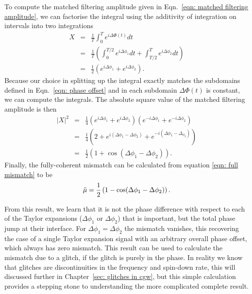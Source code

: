 \documentclass[../full_thesis/full_thesis.tex]{subfiles}
\begin{document}
To compute the matched filtering amplitude given in Eqn.~\eqref{eqn: matched
filtering amplitude}, we can factorise the integral using the additivity of
integration on intervals into two integrations
\begin{eqnarray}
X & = &\frac{1}{T } \int_{0}^{T}e^{i\Delta\Phi(t)} dt\\
 & = &\frac{1}{T }\left(\int_{0}^{T /2}e^{i\Delta\phi_{1}} dt  +
\int_{T/2}^{T} e^{i\Delta\phi_{2}}dt\right)\\
& = & \frac{1}{2}\left(e^{i\Delta\phi_{1}} + e^{i\Delta\phi_{2}}\right).
\end{eqnarray}
Because our choice in splitting up the integral exactly matches the subdomains
defined in Eqn.~\eqref{eqn: phase offset} and in each subdomain $\Delta\Phi(t)$
is constant, we can compute the integrals.
The absolute square value of the matched filtering amplitude is then
\begin{eqnarray}
|X|^{2}& = &\frac{1}{4}\left(e^{i\Delta\phi_{1}} + e^{i\Delta\phi_{2}}\right) \left(e^{-i\Delta\phi_{1}} + e^{-i\Delta\phi_{2}}\right)\\
& = &\frac{1}{4} \left(2 + e^{i(\Delta\phi_{1} - \Delta \phi_{2})} +  e^{-i(\Delta\phi_{1} - \Delta_{\phi_{2}})} \right) \\
& = &\frac{1}{2}\left(1 + \cos(\Delta\phi_{1} - \Delta\phi_{2})\right).
\end{eqnarray}
Finally, the fully-coherent mismatch can be calculated from equation \eqref{eqn: full mismatch}
to be
\begin{equation}
\tilde{\mu} = \frac{1}{2}\left(1 - \cos(\Delta\phi_{1} - \Delta\phi_{2})\right).
\label{eqn: two segment phase mismatch}
\end{equation}

From this result, we learn that it is not the phase difference with respect to
each of the Taylor expansions ($\Delta\phi_1$ or $\Delta\phi_2$) that is
important, but the total phase jump at their interface. For $\Delta \phi_{1} =
\Delta \phi_{2}$ the mismatch vanishes, this recovering the case of a single
Taylor expansion signal with an arbitrary overall phase offset, which always has
zero mismatch. This result can be used to calculate the mismatch due to a glitch,
if the glitch is purely in the phase. In reality we know that glitches are
discontinuities in the frequency and spin-down rate, this will discussed further
in Chapter~\ref{sec: glitches in cgw}, but this simple calculation provides
a stepping stone to understanding the more complicated complete result.
\end{document}
